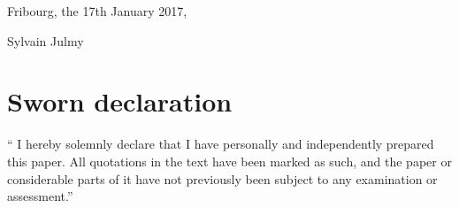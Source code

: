 Fribourg, the 17th January 2017,

Sylvain Julmy

\chapter*{Sworn declaration}

`` I hereby solemnly declare that I have personally and independently prepared
this paper. All quotations in the text have been marked as such, and the paper
or considerable parts of it have not previously been subject to any examination
or assessment.''

\listoffigures
\listoflistings

